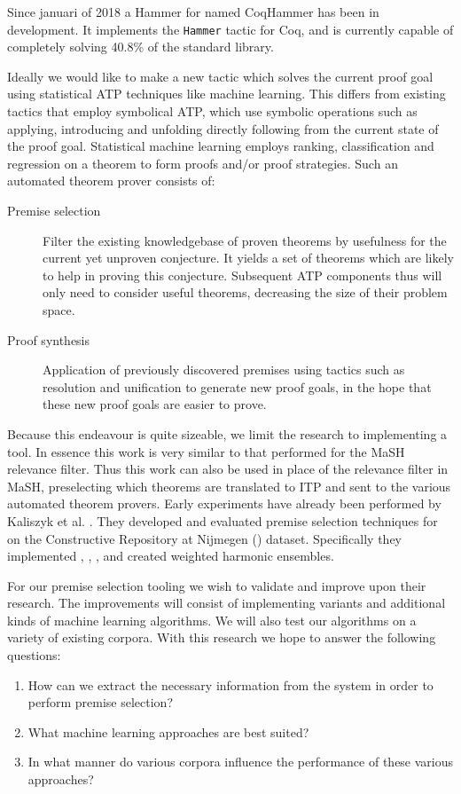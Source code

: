 Since januari of 2018 a Hammer for \coq named CoqHammer has been in development. \cite{czajka2018hammer}
It implements the \texttt{Hammer} tactic for Coq,
and is currently capable of completely solving 40.8\% of the \coq standard library.

Ideally we would like to make a new tactic which solves the current proof goal using statistical ATP techniques like machine learning.
This differs from existing tactics that employ symbolical ATP,
which use symbolic operations such as applying, introducing and unfolding
directly following from the current state of the proof goal.
Statistical machine learning employs ranking, classification and regression on a theorem to form proofs and/or proof strategies.
Such an automated theorem prover consists of:
\begin{description}
\item[Premise selection] Filter the existing knowledgebase of proven theorems by usefulness for the current yet unproven conjecture.
It yields a set of theorems which are likely to help in proving this conjecture.
Subsequent ATP components thus will only need to consider useful theorems, decreasing the size of their problem space.
\item[Proof synthesis] Application of previously discovered premises using tactics
such as resolution and unification \cite{dowek1993complete} to generate new proof goals,
in the hope that these new proof goals are easier to prove.
\end{description}

Because this endeavour is quite sizeable, we limit the research to implementing a \premiseselection tool.
In essence this work is very similar to that performed for the MaSH relevance filter.
Thus this work can also be used in place of the relevance filter in MaSH, preselecting which
theorems are translated to ITP and sent to the various automated theorem provers.
Early experiments have already been performed by Kaliszyk et al. \cite{kaliszyk2014machine}.
They developed and evaluated premise selection techniques for \coq on the Constructive \coq Repository at Nijmegen (\corn) dataset.
Specifically they implemented \knn, \nb, \mepo, and created weighted harmonic ensembles.

For our premise selection tooling we wish to validate and improve upon their research.
The improvements will consist of implementing variants and additional kinds of machine learning algorithms.
We will also test our algorithms on a variety of existing \coq corpora.
With this research we hope to answer the following questions:
\begin{enumerate}
\item How can we extract the necessary information from the \coq system in order to perform premise selection?
\item What machine learning approaches are best suited?
\item In what manner do various corpora influence the performance of these various approaches?
\end{enumerate}
